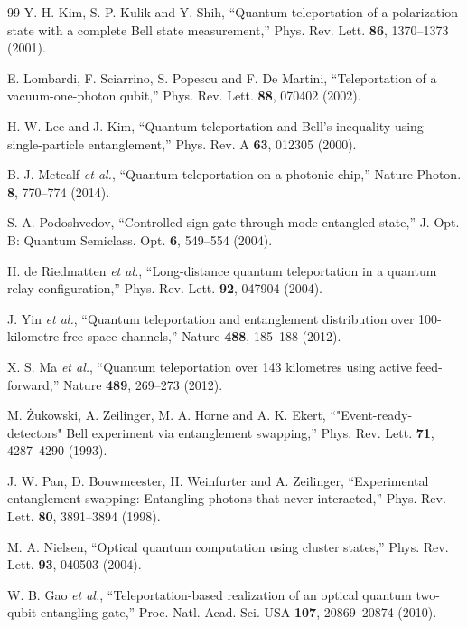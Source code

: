 \documentclass{optica-article}
\begin{document}
\begin{thebibliography}{99}
         Y. H. Kim, S. P. Kulik and Y. Shih, ``Quantum teleportation of a polarization state with a complete Bell state measurement,'' Phys. Rev. Lett. {\bf 86}, 1370--1373 (2001).
        
         E. Lombardi, F. Sciarrino, S. Popescu and F. De Martini, ``Teleportation of a vacuum-one-photon qubit,'' Phys. Rev. Lett. {\bf 88}, 070402 (2002).
        
         H. W. Lee and J. Kim, ``Quantum teleportation and Bell's inequality using single-particle entanglement,'' Phys. Rev. A {\bf 63}, 012305 (2000).
        
         B. J. Metcalf {\it et al.}, ``Quantum teleportation on a photonic chip,'' Nature Photon. {\bf 8}, 770--774 (2014).
        
         S. A. Podoshvedov, ``Controlled sign gate through mode entangled state,'' J. Opt. B: Quantum Semiclass. Opt. {\bf 6}, 549--554 (2004).
        
         H. de Riedmatten {\it et al.}, ``Long-distance quantum teleportation in a quantum relay configuration,'' Phys. Rev. Lett. {\bf 92}, 047904 (2004).
        
         J. Yin {\it et al.}, ``Quantum teleportation and entanglement distribution over 100-kilometre free-space channels,'' Nature {\bf 488}, 185--188 (2012).
        
         X. S. Ma {\it et al.}, ``Quantum teleportation over 143 kilometres using active feed-forward,'' Nature {\bf 489}, 269--273 (2012).
        
         M. Żukowski, A. Zeilinger, M. A. Horne and A. K. Ekert, ``"Event-ready-detectors" Bell experiment via entanglement swapping,'' Phys. Rev. Lett. {\bf 71}, 4287--4290 (1993).
        
         J. W. Pan, D. Bouwmeester, H. Weinfurter and A. Zeilinger, ``Experimental entanglement swapping: Entangling photons that never interacted,'' Phys. Rev. Lett. {\bf 80}, 3891--3894 (1998).
        
         M. A. Nielsen, ``Optical quantum computation using cluster states,'' Phys. Rev. Lett. {\bf 93}, 040503 (2004).
        
         W. B. Gao {\it et al.}, ``Teleportation-based realization of an optical quantum two-qubit entangling gate,'' Proc. Natl. Acad. Sci. USA {\bf 107}, 20869--20874 (2010).
        

\end{thebibliography}
\end{document}
